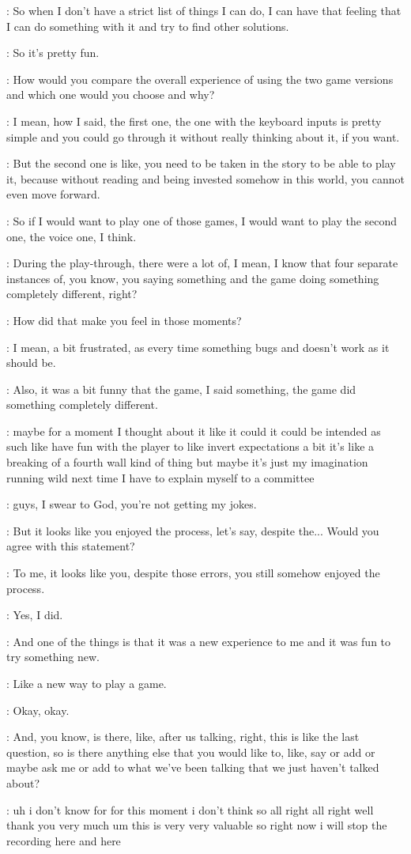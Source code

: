 \Kacper: So when I don't have a strict list of things I can do, I can have that feeling that I can do something with it and try to find other solutions.

\Kacper: So it's pretty fun.

\Gabriel: How would you compare the overall experience of using the two game versions and which one would you choose and why?

\Kacper: I mean, how I said, the first one, the one with the keyboard inputs is pretty simple and you could go through it without really thinking about it, if you want.

\Kacper: But the second one is like, you need to be taken in the story to be able to play it, because without reading and being invested somehow in this world, you cannot even move forward.

\Kacper: So if I would want to play one of those games, I would want to play the second one, the voice one, I think.

\Gabriel: During the play-through, there were a lot of, I mean, I know that four separate instances of, you know, you saying something and the game doing something completely different, right?

\Gabriel: How did that make you feel in those moments?

\Kacper: I mean, a bit frustrated, as every time something bugs and doesn't work as it should be.

\Kacper: Also, it was a bit funny that the game, I said something, the game did something completely different.

\Kacper: maybe for a moment I thought about it like it could it could be intended as such like have fun with the player to like invert expectations a bit it's like a breaking of a fourth wall kind of thing but maybe it's just my imagination running wild next time I have to explain myself to a committee

\Gabriel: guys, I swear to God, you're not getting my jokes.

\Gabriel: But it looks like you enjoyed the process, let's say, despite the... Would you agree with this statement?

\Gabriel: To me, it looks like you, despite those errors, you still somehow enjoyed the process.

\Kacper: Yes, I did.

\Kacper: And one of the things is that it was a new experience to me and it was fun to try something new.

\Kacper: Like a new way to play a game.

\Kacper: Okay, okay.

\Gabriel: And, you know, is there, like, after us talking, right, this is like the last question, so is there anything else that you would like to, like, say or add or maybe ask me or add to what we've been talking that we just haven't talked about?

\Gabriel: uh i don't know for for this moment i don't think so all right all right well thank you very much um this is very very valuable so right now i will stop the recording here and here


